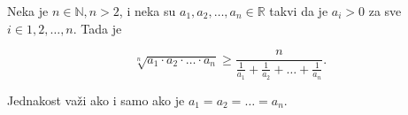 \documentclass[11pt]{article}
\newcommand{\N}{\mathbb{N}}
\newcommand{\R}{\mathbb{R}}
\begin{document}
	\noindent
	Neka je $ n \in \N, n > 2 $, i neka su $ a_1, a_2, \dots, a_n \in \R $ takvi da je $ a_i > 0 $ za
	sve $ i \in {1, 2, \dots, n} $. Tada je

	\begin{equation*}
		\sqrt[n]{a_1 \cdot a_2 \cdot \ldots \cdot a_n} \ge \frac{n}{\frac{1}{a_1} + \frac{1}{a_2} + \ldots + \frac{1}{a_n}}.
	\end{equation*}

	Jednakost va\v zi ako i samo ako je $ a_1 = a_2 = \dots = a_n $.
\end{document}
